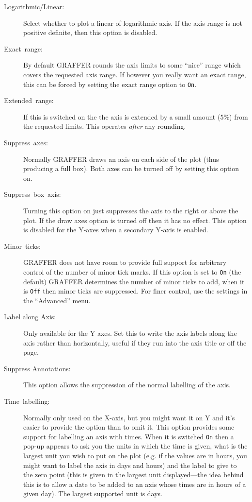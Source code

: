 \documentclass[11pt,twoside,english]{article}
\begin{document}
\begin{description}
  \begin{description}
  \item [Logarithmic/Linear:] Select whether to plot a linear of
    logarithmic axis. If the axis range is not positive definite, then
    this option is disabled.
  \item [Exact~range:] By default GRAFFER rounds the
    axis limits to some {}``nice'' range which covers the requested
    axis range. If however you really want an exact range, this can be
    forced by setting the exact range option to \texttt{On}.
  \item [Extended~range:] If this is switched on the the axis is
    extended by a small amount (5\%) from the requested limits. This
    operates \textit{after} any rounding.
  \item [Suppress~axes:] Normally GRAFFER draws an axis on each side of
    the plot (thus producing a full box). Both axes can be turned off
    by setting this option on.
  \item [Suppress~box~axis:]Turning this option on just
    suppresses the axis to the right or above the plot. If the draw
    axes option is turned off then it has no effect. This option is
    disabled for the Y-axes when a secondary Y-axis is enabled.
  \item [Minor~ticks:] GRAFFER does not have room to provide full
    support for arbitrary control of the number of minor tick marks. If
    this option is set to \texttt{On} (the default) GRAFFER determines the
    number of minor ticks to add, when it is \texttt{Off} then minor
    ticks are suppressed. For finer control, use the settings in the
    ``Advanced'' menu.
  \item[Label along Axis:] Only available for the Y axes. Set this to
    write the axis labels along the axis rather than horizontally,
    useful if they run into the axis title or off the page.
  \item[Suppress Annotations:] This option allows the suppression of
    the normal labelling of the axis.
  \item [Time~labelling:]Normally only used on the X-axis, but you
    might want it on Y and it's easier to provide the option than to
    omit it.  This option provides some support for
    labelling an axis with times.  When it is switched \texttt{On} then
    a pop-up appears to ask you the units in which the time is given,
    what is the largest unit you wish to put on the plot (e.g. if the
    values are in hours, you might want to label the axis in days and
    hours) and the label to give to the zero point (this is given in
    the largest unit displayed---the idea behind this is to allow a
    date to be added to an axis whose times are in hours of a given
    day). The largest supported unit is days.


\end{description}
\end{description}
\end{document}

